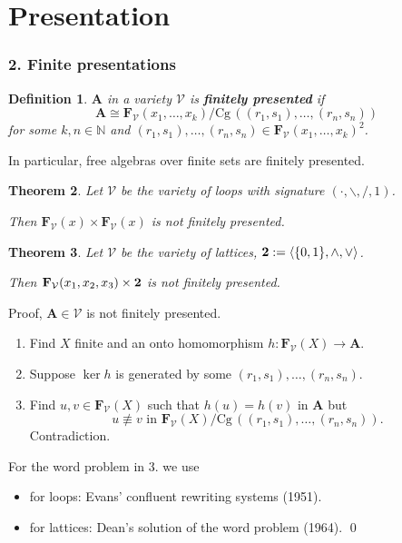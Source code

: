 \documentclass{beamer}
\newtheorem{thm}{Theorem}
\newtheorem{de}[thm]{Definition}
\theoremstyle{definition}
\newcommand{\algop}[2]{\langle {#1}, {#2} \rangle}
\newcommand{\Cg}{\mathrm{Cg}\,}
\newcommand{\Fr}{{\mathbf{F}}}
\newcommand{\A}{{\mathbf A}}
\newcommand{\V}{{\mathcal V}}
\newcommand{\N}{{\mathbb N}}
\begin{document}
\section{Presentation}

 
\begin{frame}
\frametitle{2. Finite presentations}

\begin{de}
 $\A$ in a variety $\V$ is {\bf finitely presented} if
 $$\A\cong \Fr_\V(x_1,\dots,x_k) / \Cg((r_1,s_1),\dots,(r_n,s_n))$$
 for some $k,n\in\N$ and $(r_1,s_1),\dots,(r_n,s_n) \in\Fr_\V(x_1,\dots,x_k)^2$.
\end{de}

 In particular, free algebras over finite sets are finitely presented.

\bigskip

\begin{thm}
 Let $\V$ be the variety of loops with signature $(\cdot,\backslash,/,1)$.

 Then $\Fr_\V(x)\times\Fr_\V(x)$ is not finitely presented.
\end{thm}


\begin{thm}
 Let $\V$ be the variety of lattices, ${\bf 2} := \algop{\{0,1\}}{\wedge,\vee}$.

 Then $\Fr_\V(x_1,x_2,x_3)\times{\bf 2}$ is not finitely presented.
\end{thm}
\end{frame}


\begin{frame}
\begin{block}{Proof, $\A\in\V$ is not finitely presented.}
\begin{enumerate}
\item
 Find $X$ finite and an onto homomorphism $h\colon\Fr_\V(X)\to\A$.
\item
 Suppose $\ker h$ is generated by some $(r_1,s_1),\dots,(r_n,s_n)$.
\item
 Find $u,v\in\Fr_\V(X)$ such that $h(u) = h(v)$ in $\A$ but
\[ u\not\equiv v \text{ in } \Fr_\V(X)/\Cg((r_1,s_1),\dots,(r_n,s_n)). \]
 Contradiction.
\end{enumerate}
 For the {\color{red} word problem} in {\color{blue}3.} we use
\begin{itemize}
\item
 for loops: Evans' confluent rewriting systems (1951).
\item
 for lattices: Dean's solution of the word problem (1964). \qed
\end{itemize}
\end{block}
\end{frame}
\end{document}
